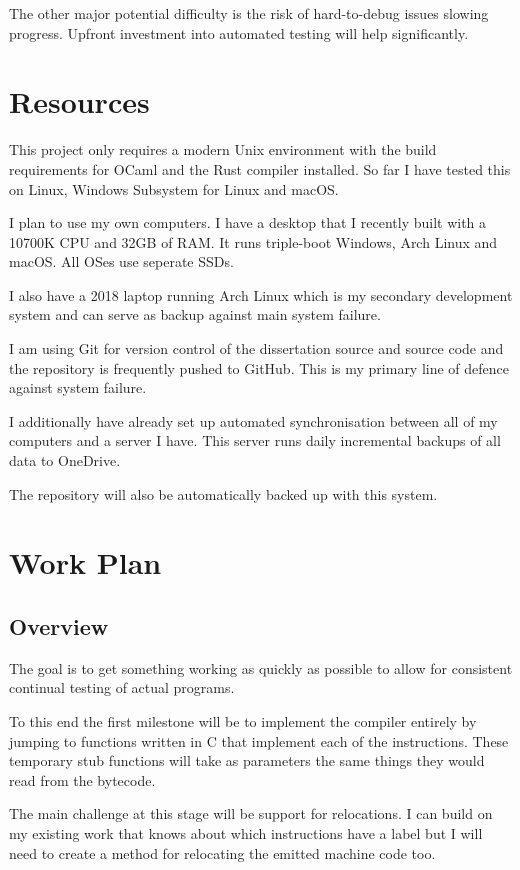 \documentclass[12pt,a4paper, headings=standardclasses]{scrartcl}
\begin{document}
The other major potential difficulty is the risk of hard-to-debug issues
slowing progress. Upfront investment into automated testing will help
significantly.

\section*{Resources}

This project only requires a modern Unix environment with the build
requirements for OCaml and the Rust compiler installed. So far I have tested
this on Linux, Windows Subsystem for Linux and macOS.

I plan to use my own computers. I have a desktop that I recently built with a
10700K CPU and 32GB of RAM. It runs triple-boot Windows, Arch Linux and
macOS. All OSes use seperate SSDs.

I also have a 2018 laptop running Arch Linux which is my secondary
development system and can serve as backup against main system failure.

I am using Git for version control of the dissertation source and source code
and the repository is frequently pushed to GitHub. This is my primary line of
defence against system failure.

I additionally have already set up automated synchronisation between all of
my computers and a server I have. This server runs daily incremental backups
of all data to OneDrive.

The repository will also be automatically backed up with this system.

\section*{Work Plan}

\subsection*{Overview}

The goal is to get something working as quickly as possible to allow for
consistent continual testing of actual programs.

To this end the first milestone will be to implement the compiler entirely by
jumping to functions written in C that implement each of the instructions.
These temporary stub functions will take as parameters the same things they
would read from the bytecode.

The main challenge at this stage will be support for relocations. I can build
on my existing work that knows about which instructions have a label but
I will need to create a method for relocating the emitted machine code too.
\end{document}
